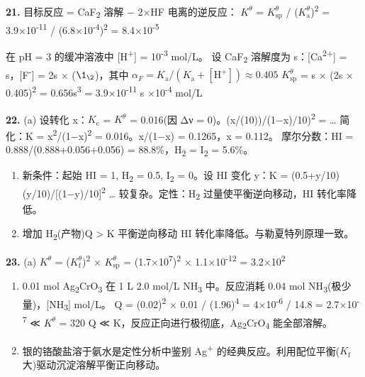 \textbf{21.} 目标反应 = CaF\textsubscript{2} 溶解 − 2×HF 电离的逆反应：
\(K^\theta\) = \(K_{\mathrm{sp}}^\theta\) / (\(K_{\mathrm a}^\theta\))\textsuperscript{2} = 3.9×10\textsuperscript{-11} / (6.8×10\textsuperscript{-4})\textsuperscript{2} = 8.4×10\textsuperscript{-5}

在 pH = 3 的缓冲溶液中 {[}H\textsuperscript{+}{]} = 10\textsuperscript{-3} mol/L。
设 CaF\textsubscript{2} 溶解度为 s：{[}Ca\textsuperscript{2+}{]} = s，{[}F\textsuperscript{-}{]} = 2s × (\(\1_{\2}\))，其中 \(\alpha_F = K_{\mathrm a}/(K_{\mathrm a}+[\mathrm{H^+}]) \approx 0.405\)
\(K_{\mathrm{sp}}^\theta\) = s × (2s × 0.405)\textsuperscript{2} = 0.656s\textsuperscript{3} = 3.9×10\textsuperscript{-11} \箭 s ×10\textsuperscript{-4} mol/L

\textbf{22.}
(a) 设转化 x：\(K_{\mathrm c}\) = \(K^\theta\) = 0.016(因 Δν = 0)。(x/(10))/(1−x)/10)\textsuperscript{2} = \ldots{} 简化：K = x\textsuperscript{2}/(1−x)\textsuperscript{2} = 0.016。x/(1−x) = 0.1265，x = 0.112。
摩尔分数：HI = 0.888/(0.888+0.056+0.056) = 88.8\%，H\textsubscript{2} = I\textsubscript{2} = 5.6\%。

\begin{enumerate}
\def\labelenumi{(\alph{enumi})}
\setcounter{enumi}{1}
\item
  新条件：起始 HI = 1, H\textsubscript{2} = 0.5, I\textsubscript{2} = 0。设 HI 变化 y：K = (0.5+y/10)(y/10)/{[}(1−y)/10{]}\textsuperscript{2} \ldots{} 较复杂。定性：H\textsubscript{2} 过量使平衡逆向移动，HI 转化率降低。
\item
  增加 H\textsubscript{2}(产物)\箭 Q \textgreater{} K \箭 平衡逆向移动 \箭 HI 转化率降低。与勒夏特列原理一致。
\end{enumerate}

\textbf{23.}
(a) \(K^\theta\) = (\(K_{\mathrm f}^\theta\))\textsuperscript{2} × \(K_{\mathrm{sp}}^\theta\) = (1.7×10\textsuperscript{7})\textsuperscript{2} × 1.1×10\textsuperscript{-12} = 3.2×10\textsuperscript{2}

\begin{enumerate}
\def\labelenumi{(\alph{enumi})}
\setcounter{enumi}{1}
\item
  0.01 mol Ag\textsubscript{2}CrO\textsubscript{3} 在 1 L 2.0 mol/L NH\textsubscript{3} 中。反应消耗 0.04 mol NH\textsubscript{3}(极少量)，{[}NH\textsubscript{3}{]}  mol/L。
  Q = (0.02)\textsuperscript{2} × 0.01 / (1.96)\textsuperscript{4} = 4×10\textsuperscript{-6} / 14.8 = 2.7×10\textsuperscript{-7} ≪ \(K^\theta\) = 320
  Q ≪ K，反应正向进行极彻底，Ag\textsubscript{2}CrO\textsubscript{4} 能全部溶解。
\item
  银的铬酸盐溶于氨水是定性分析中鉴别 Ag\textsuperscript{+} 的经典反应。利用配位平衡(\(K_{\mathrm f}\) 大)驱动沉淀溶解平衡正向移动。
\end{enumerate}

